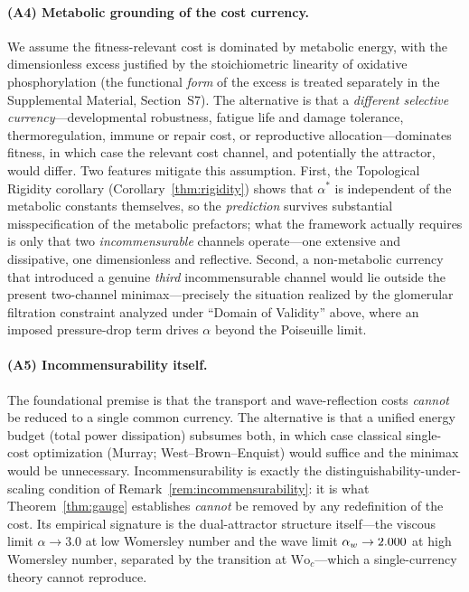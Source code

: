 \paragraph{(A4) Metabolic grounding of the cost currency.}
We assume the fitness-relevant cost is dominated by metabolic energy, with
the dimensionless excess justified by the stoichiometric linearity of oxidative
phosphorylation (the functional \emph{form} of the excess is treated separately
in the Supplemental Material, Section~S7). The alternative is that a
\emph{different selective currency}---developmental robustness, fatigue life and
damage tolerance, thermoregulation, immune or repair cost, or reproductive
allocation---dominates fitness, in which case the relevant cost channel, and
potentially the attractor, would differ. Two features mitigate this assumption.
First, the Topological Rigidity corollary (Corollary~\ref{thm:rigidity}) shows
that $\alpha^*$ is independent of the metabolic constants themselves, so the
\emph{prediction} survives substantial misspecification of the metabolic
prefactors; what the framework actually requires is only that two
\emph{incommensurable} channels operate---one extensive and dissipative, one
dimensionless and reflective. Second, a non-metabolic currency that introduced a
genuine \emph{third} incommensurable channel would lie outside the present
two-channel minimax---precisely the situation realized by the glomerular
filtration constraint analyzed under ``Domain of Validity'' above, where an
imposed pressure-drop term drives $\alpha$ beyond the Poiseuille limit.

\paragraph{(A5) Incommensurability itself.}
The foundational premise is that the transport and wave-reflection costs
\emph{cannot} be reduced to a single common currency. The alternative is that a
unified energy budget (total power dissipation) subsumes both, in which case
classical single-cost optimization (Murray; West--Brown--Enquist) would suffice
and the minimax would be unnecessary. Incommensurability is exactly the
distinguishability-under-scaling condition of
Remark~\ref{rem:incommensurability}: it is what Theorem~\ref{thm:gauge}
establishes \emph{cannot} be removed by any redefinition of the cost. Its
empirical signature is the dual-attractor structure itself---the viscous limit
$\alpha\to3.0$ at low Womersley number and the wave limit
$\alpha_w\to2.000$ at high Womersley number, separated by the transition at
$\mathrm{Wo}_c$---which a single-currency theory cannot reproduce.

